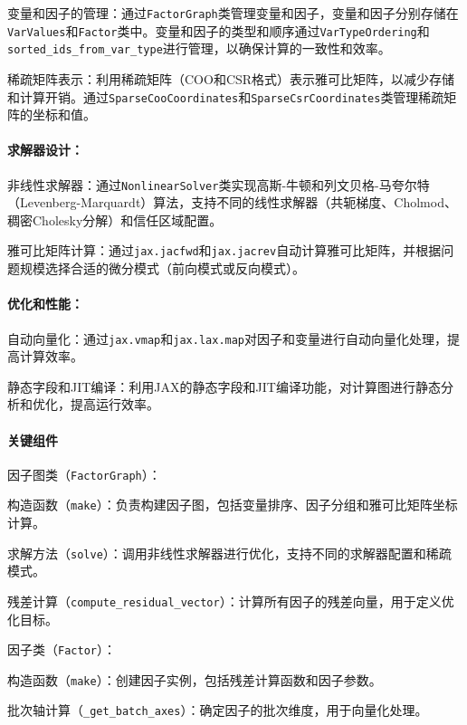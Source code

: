 \documentclass{ctexart}
\begin{document}
变量和因子的管理：通过\texttt{FactorGraph}类管理变量和因子，变量和因子分别存储在\texttt{VarValues}和\texttt{Factor}类中。变量和因子的类型和顺序通过\texttt{VarTypeOrdering}和\texttt{sorted\_ids\_from\_var\_type}进行管理，以确保计算的一致性和效率。

稀疏矩阵表示：利用稀疏矩阵（COO和CSR格式）表示雅可比矩阵，以减少存储和计算开销。通过\texttt{SparseCooCoordinates}和\texttt{SparseCsrCoordinates}类管理稀疏矩阵的坐标和值。

\paragraph{求解器设计：}

非线性求解器：通过\texttt{NonlinearSolver}类实现高斯-牛顿和列文贝格-马夸尔特（Levenberg-Marquardt）算法，支持不同的线性求解器（共轭梯度、Cholmod、稠密Cholesky分解）和信任区域配置。

雅可比矩阵计算：通过\texttt{jax.jacfwd}和\texttt{jax.jacrev}自动计算雅可比矩阵，并根据问题规模选择合适的微分模式（前向模式或反向模式）。

\paragraph{优化和性能：}

自动向量化：通过\texttt{jax.vmap}和\texttt{jax.lax.map}对因子和变量进行自动向量化处理，提高计算效率。

静态字段和JIT编译：利用JAX的静态字段和JIT编译功能，对计算图进行静态分析和优化，提高运行效率。

\paragraph{关键组件}

因子图类（\texttt{FactorGraph}）：

构造函数（\texttt{make}）：负责构建因子图，包括变量排序、因子分组和雅可比矩阵坐标计算。

求解方法（\texttt{solve}）：调用非线性求解器进行优化，支持不同的求解器配置和稀疏模式。

残差计算（\texttt{compute\_residual\_vector}）：计算所有因子的残差向量，用于定义优化目标。

因子类（\texttt{Factor}）：

构造函数（\texttt{make}）：创建因子实例，包括残差计算函数和因子参数。

批次轴计算（\texttt{\_get\_batch\_axes}）：确定因子的批次维度，用于向量化处理。
\end{document}
